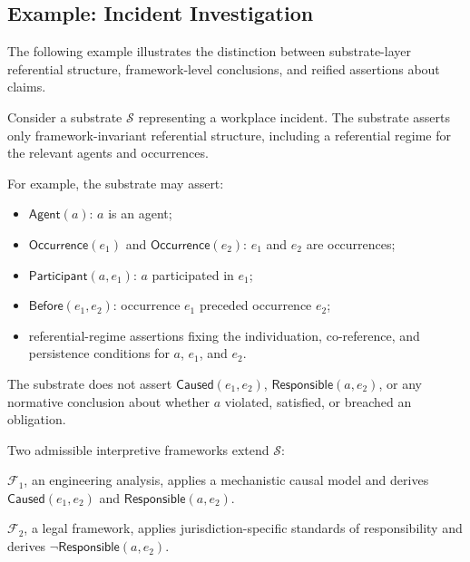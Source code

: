 \subsection{Example: Incident Investigation}
\label{subsec:incident}

The following example illustrates the distinction between
substrate-layer referential structure,
framework-level conclusions,
and reified assertions about claims.

\begin{example}
  \label{ex:incident}

  Consider a substrate $\mathcal{S}$ representing a workplace incident.
  The substrate asserts only framework-invariant referential structure,
  including a referential regime for the relevant agents and occurrences.

  For example, the substrate may assert:

  \begin{itemize}
    \item $\mathsf{Agent}(a)$: $a$ is an agent;
    \item $\mathsf{Occurrence}(e_1)$ and $\mathsf{Occurrence}(e_2)$:
          $e_1$ and $e_2$ are occurrences;
    \item $\mathsf{Participant}(a,e_1)$:
          $a$ participated in $e_1$;
    \item $\mathsf{Before}(e_1,e_2)$:
          occurrence $e_1$ preceded occurrence $e_2$;
    \item referential-regime assertions fixing the individuation,
          co-reference, and persistence conditions for $a$, $e_1$, and $e_2$.
  \end{itemize}

  The substrate does not assert
  $\mathsf{Caused}(e_1,e_2)$,
  $\mathsf{Responsible}(a,e_2)$,
  or any normative conclusion about whether $a$ violated,
  satisfied, or breached an obligation.

  Two admissible interpretive frameworks extend $\mathcal{S}$:

  \medskip

  \noindent
  $\mathcal{F}_1$,
  an engineering analysis,
  applies a mechanistic causal model and derives
  $\mathsf{Caused}(e_1,e_2)$
  and
  $\mathsf{Responsible}(a,e_2)$.

  \noindent
  $\mathcal{F}_2$,
  a legal framework,
  applies jurisdiction-specific standards of responsibility
  and derives
  $\neg\mathsf{Responsible}(a,e_2)$.


\end{example}

